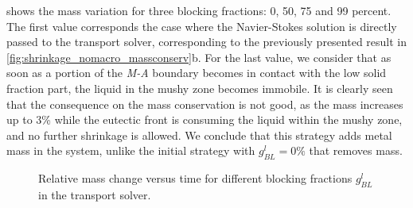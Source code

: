  shows the mass variation for three blocking fractions: 0, 50, 75 and 99 percent.
The first value corresponds the case where the Navier-Stokes solution is directly passed to the transport solver, 
corresponding to the previously presented result in \cref{fig:shrinkage_nomacro_massconserv}b.
For the last value, we consider that as soon as a portion of the \emph{M-A} boundary becomes
in contact with the low solid fraction part, the liquid in the mushy zone becomes immobile. 
It is clearly seen that the consequence on the mass conservation is not good, as 
the mass increases up to 3\% while the eutectic front is consuming the liquid within the mushy zone, and no further shrinkage is allowed.
We conclude that this strategy adds metal mass in the system, unlike the initial strategy with $g_{BL}^l=0\%$ that
removes mass.

\begin{figure}[htbp]
\centering
{}
\caption{Relative mass change versus time for different blocking fractions $g_{BL}^l$ in the transport solver.}
\label{fig:massconserv_blockingpct}
\end{figure}

